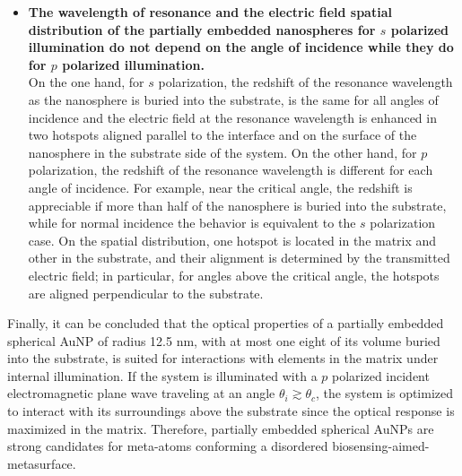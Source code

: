\begin{itemize}
        \item \textbf{The wavelength of resonance and the electric field spatial distribution of the partially embedded nanospheres for $s$ polarized illumination do not depend on the angle of incidence while they do for $p$ polarized illumination.}\\
        On the one hand, for $s$ polarization, the redshift of the resonance wavelength as the nanosphere is buried into the substrate, is  the same for all angles of incidence and the  electric field at the resonance wavelength is enhanced in two hotspots aligned parallel to the interface and on the surface of the nanosphere in the substrate side of the system. On the other hand, for $p$ polarization, the redshift of the resonance wavelength is different for each angle of incidence. For example, near the critical angle, the redshift is appreciable if more than half of the nanosphere is buried into the substrate, while for normal incidence the behavior is equivalent to the $s$ polarization case. On the spatial distribution, one hotspot is located in the matrix and other in the substrate, and their alignment is determined by the transmitted electric field; in particular, for angles above the critical angle, the hotspots are aligned perpendicular to the substrate.
    \end{itemize}

Finally, it can be concluded that the optical properties of a partially embedded spherical AuNP of radius 12.5 nm, with at most one eight of its volume buried into the substrate, is suited for interactions with elements in the matrix under internal illumination. If the system is illuminated with a $p$ polarized incident electromagnetic plane wave traveling at an angle  $\theta_i \gtrsim \theta_c$, the system is optimized to interact with its surroundings above the substrate since the optical response is maximized in the matrix. Therefore, partially embedded spherical AuNPs are strong candidates for meta-atoms conforming a disordered biosensing-aimed-metasurface.
